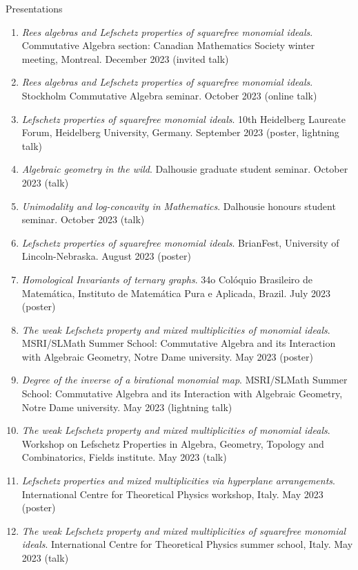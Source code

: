 \documentclass{resume} %
\begin{document}
\begin{rSection}{Presentations}
    \begin{enumerate}
        \item \textit{Rees algebras and Lefschetz properties of squarefree monomial ideals}. Commutative Algebra section: Canadian Mathematics Society winter meeting, Montreal. December 2023 (invited talk)
        \item \textit{Rees algebras and Lefschetz properties of squarefree monomial ideals}. Stockholm Commutative Algebra seminar. October 2023 (online talk)
        \item \textit{Lefschetz properties of squarefree monomial ideals}. 10th Heidelberg Laureate Forum, Heidelberg University, Germany. September 2023 (poster, lightning talk)
        \item \textit{Algebraic geometry in the wild}. Dalhousie graduate student seminar. October 2023 (talk)
        \item \textit{Unimodality and log-concavity in Mathematics}. Dalhousie honours student seminar. October 2023 (talk)
        \item \textit{Lefschetz properties of squarefree monomial ideals}. BrianFest, University of Lincoln-Nebraska. August 2023 (poster)
        \item \textit{Homological Invariants of ternary graphs}. 34o Colóquio Brasileiro de Matemática, Instituto de Matemática Pura e Aplicada, Brazil. July 2023 (poster)
        \item \textit{The weak Lefschetz property and mixed multiplicities of monomial ideals}. MSRI/SLMath Summer School: Commutative Algebra and its Interaction with Algebraic Geometry, Notre Dame university. May 2023 (poster)
        \item \textit{Degree of the inverse of a birational monomial map}. MSRI/SLMath Summer School: Commutative Algebra and its Interaction with Algebraic Geometry, Notre Dame university. May 2023 (lightning talk)
        \item \textit{The weak Lefschetz property and mixed multiplicities of monomial ideals}. Workshop on Lefschetz Properties in Algebra, Geometry, Topology and Combinatorics, Fields institute. May 2023 (talk)
        \item \textit{Lefschetz properties and mixed multiplicities via hyperplane arrangements}. International Centre for Theoretical Physics workshop, Italy. May 2023 (poster)
        \item \textit{The weak Lefschetz property and mixed multiplicities of squarefree monomial ideals}. International Centre for Theoretical Physics summer school, Italy. May 2023 (talk)

\end{enumerate}
\end{rSection}
\end{document}
